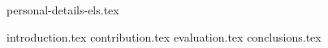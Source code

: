 \documentclass[twocolumn,preprint,3p,number]{elsarticle}
\theoremstyle{plain}
\theoremstyle{definition}
\begin{document}
	{personal-details-els.tex}

	{introduction.tex}
	{contribution.tex}
	{evaluation.tex}
	{conclusions.tex}


	
	
\end{document}
